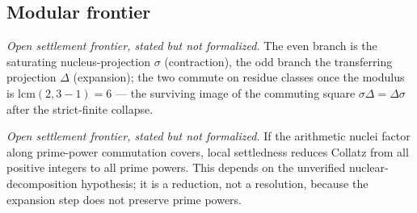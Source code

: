 \subsection{Modular frontier}

\begin{theorem}
  \label{thm:collatz-mod6-commute}
  \notready
  \emph{Open settlement frontier, stated but not formalized.}
  The even branch is the saturating nucleus-projection $\sigma$ (contraction), the
  odd branch the transferring projection $\Delta$ (expansion); the two commute on
  residue classes once the modulus is $\mathrm{lcm}(2,3-1)=6$ --- the surviving
  image of the commuting square $\sigma\Delta=\Delta\sigma$ after the
  strict-finite collapse.
\end{theorem}

\begin{theorem}
  \label{thm:collatz-prime-power}
  \notready
  \emph{Open settlement frontier, stated but not formalized.} If the arithmetic
  nuclei factor along prime-power commutation covers, local settledness reduces
  Collatz from all positive integers to all prime powers. This depends on the
  unverified nuclear-decomposition hypothesis; it is a reduction, not a
  resolution, because the expansion step does not preserve prime powers.
\end{theorem}
